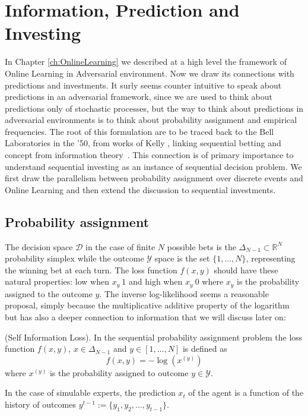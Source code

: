 \chapter{Information, Prediction and Investing}

In Chapter \ref{ch:OnlineLearning} we described at a high level the framework of Online Learning in Adversarial environment. Now we draw its connections with predictions and investments. It surly seems counter intuitive to speak about predictions in an adversarial framework, since we are used to think about predictions only of stochastic processes, but the way to think about predictions in adversarial environments is to think about probability assignment and empirical frequencies. The root of this formulation are to be traced back to the Bell Laboratories in the '50, from works of Kelly \cite{kelly2011new}, linking sequential betting and concept from information theory~\cite{cover2012elements}. This connection is of primary importance to understand sequential investing as an instance of sequential decision problem.
We first draw the parallelism between probability assignment over discrete events and Online Learning and then extend the discussion to sequential investments.

\section{Probability assignment}
The decision space $\mathcal D$ in the case of finite $N$ possible bets is the $\Delta_{N-1}\subset \mathbb R^{N}$ probability simplex while the outcome $\mathcal Y$ space is the set $\{1,\ldots,N\}$, representing the winning bet at each turn. The loss function $f(x,y)$ should have these natural properties: low when $x_y~1$ and high when $x_y~0$ where $x_y$ is the probability assigned to the outcome $y$. The inverse log-likelihood seems a reasonable proposal, simply because the multiplicative additive property of the logarithm but has also a deeper connection to information that we will discuss later on:

\begin{definition}(Self Information Loss).
    In the sequential probability assignment problem the loss function $f(x,y)$, $x\in \Delta_{N-1}$ and $y\in[1,\ldots,N]$ is defined as
    $$f(x,y)=-\log\left(x^{(y)}\right)$$
where $x^{(y)}$ is the probability assigned to outcome $y\in\mathcal Y$.
\end{definition}

In the case of simulable experts, the prediction $x_t$ of the agent is a function of the history of outcomes $y^{t-1}:=\{y_1,y_2,\ldots,y_{t-1}\}$.

